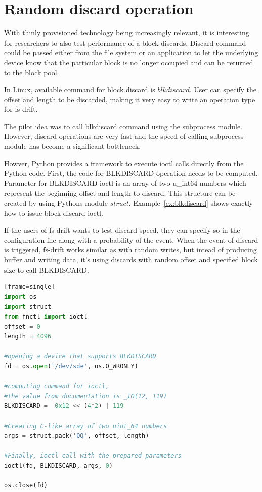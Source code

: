 \documentclass[
  color, %
  table, %
  lof,   %
  lot,   %
]{fithesis3}
\begin{document}
\section{Random discard operation}
With thinly provisioned technology being increasingly relevant, it is interesting for researchers to also test performance of a block discards. Discard command could be passed either from the file system or an application to let the underlying device know that the particular block is no longer occupied and can be returned to the block pool.

In Linux, available command for block discard is $blkdiscard$. User can specify the offset and length to be discarded, making it very easy to write an operation type for fs-drift.

The pilot idea was to call blkdiscard command using the subprocess module. However, discard operations are very fast and the speed of calling subprocess module has become a significant bottleneck.

Howver, Python provides a framework to execute ioctl calls directly from the Python code. First, the code for BLKDISCARD operation needs to be computed. Parameter for BLKDISCARD ioctl is an array of two u\_int64 numbers which represent the beginning offset and length to discard. This structure can be created by using Pythons module $struct$. Example~\ref{ex:blkdiscard} shows exactly how to issue block discard ioctl.

If the users of fs-drift wants to test discard speed, they can specify so in the configuration file along with a probability of the event. When the event of discard is triggered, fs-drift works similar as with random writes, but intead of producing buffer and writing data, it's using discards with random offset and specified block size to call BLKDISCARD.




\begin{lstlisting}[language=Python, caption={Using BLKDISCARD ioctl to discard first 4096 bytes of a device /dev/sde},label={ex:blkdiscard}][frame=single]
import os
import struct
from fnctl import ioctl
offset = 0
length = 4096

#opening a device that supports BLKDISCARD
fd = os.open('/dev/sde', os.O_WRONLY)    

#computing command for ioctl,
#the value from documentation is _IO(12, 119)
BLKDISCARD =  0x12 << (4*2) | 119

#Creating C-like array of two uint_64 numbers
args = struct.pack('QQ', offset, length)

#Finally, ioctl call with the prepared parameters
ioctl(fd, BLKDISCARD, args, 0)

os.close(fd)
\end{lstlisting}
\end{document}
